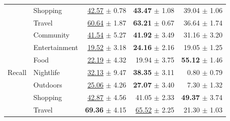 \begin{table}[htbp]
\begin{tabular}{llrrr}
                           & Shopping      & \underline{42.57} $\pm$ 0.78 & \textbf{43.47} $\pm$ 1.08    & 39.04 $\pm$ 1.06 \\
                           & Travel        & \underline{60.64} $\pm$ 1.87 & \textbf{63.21} $\pm$ 0.67    & 36.64 $\pm$ 1.74 \\
\midrule
\multirow{7}{*}{Recall}    & Community     & \underline{41.54} $\pm$ 5.27             & \textbf{41.92} $\pm$ 3.49    & 31.16 $\pm$ 3.20 \\
                           & Entertainment & \underline{19.52} $\pm$ 3.18             & \textbf{24.16} $\pm$ 2.16    & 19.05 $\pm$ 1.25 \\
                           & Food          & \underline{22.19} $\pm$ 4.32 & 19.94 $\pm$ 3.75             & \textbf{55.12} $\pm$ 1.46 \\
                           & Nightlife     & \underline{32.13} $\pm$ 9.47             & \textbf{38.35} $\pm$ 3.11    & 0.80 $\pm$ 0.79 \\
                           & Outdoors      & \underline{25.06} $\pm$ 4.26             & \textbf{27.07} $\pm$ 3.40    & 7.30 $\pm$ 1.32 \\
                           & Shopping      & \underline{42.87} $\pm$ 4.56             & 41.05 $\pm$ 2.33             & \textbf{49.37} $\pm$ 3.74 \\
                           & Travel        & \textbf{69.36} $\pm$ 4.15    & \underline{65.52} $\pm$ 2.25 & 21.30 $\pm$ 1.03 \\
\bottomrule
\end{tabular}
\end{table}
